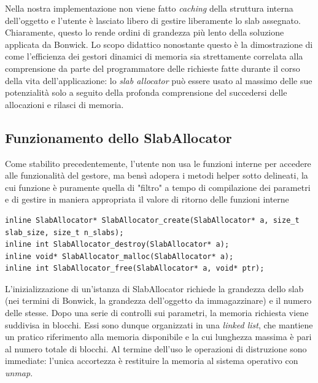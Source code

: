 Nella nostra implementazione non viene fatto \textit{caching} della struttura interna dell’oggetto e l’utente è lasciato libero di gestire liberamente lo slab assegnato. Chiaramente, questo lo rende ordini di grandezza più lento della soluzione applicata da Bonwick. Lo scopo didattico nonostante questo è la dimostrazione di come l’efficienza dei gestori dinamici di memoria sia strettamente correlata alla comprensione da parte del programmatore delle richieste fatte durante il corso della vita dell’applicazione: lo \textit{slab allocator} può essere usato al massimo delle sue potenzialità solo a seguito della profonda comprensione del succedersi delle allocazioni e rilasci di memoria.

\subsection*{Funzionamento dello SlabAllocator}
Come stabilito precedentemente, l’utente non usa le funzioni interne per accedere alle funzionalità del gestore, ma bensì adopera i metodi helper sotto delineati, la cui funzione è puramente quella di "filtro" a tempo di compilazione dei parametri e di gestire in maniera appropriata il valore di ritorno delle funzioni interne

\begin{lstlisting}
inline SlabAllocator* SlabAllocator_create(SlabAllocator* a, size_t slab_size, size_t n_slabs);
inline int SlabAllocator_destroy(SlabAllocator* a);
inline void* SlabAllocator_malloc(SlabAllocator* a);
inline int SlabAllocator_free(SlabAllocator* a, void* ptr);
\end{lstlisting}

L’inizializzazione di un’istanza di SlabAllocator richiede la grandezza dello slab (nei termini di Bonwick, la grandezza dell’oggetto da immagazzinare) e il numero delle stesse. Dopo una serie di controlli sui parametri, la memoria richiesta viene suddivisa in blocchi. Essi sono dunque organizzati in una \textit{linked list}, che mantiene un pratico riferimento alla memoria disponibile e la cui lunghezza massima è pari al numero totale di blocchi. Al termine dell’uso le operazioni di distruzione sono immediate: l’unica accortezza è restituire la memoria al sistema operativo con \textit{unmap}.

